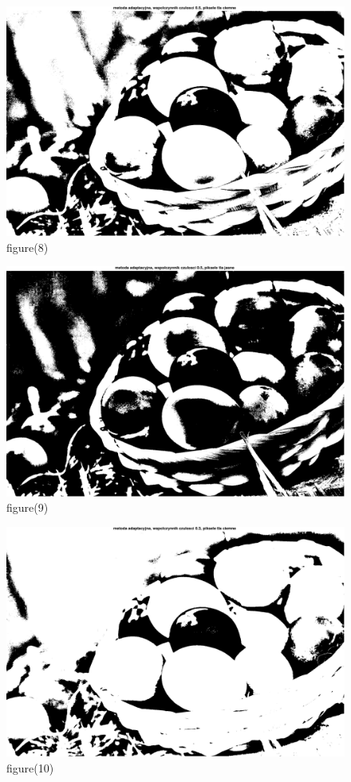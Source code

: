 \documentclass[10pt,a4paper,twoside]{article}%
\begin{document}
\begin{figure}[H]
    \centering
    \includegraphics[width=1\linewidth]{kod matlab/myVectorFile8.pdf}
\caption{figure(8)}
    \label{fig:obr1}
\end{figure}

\begin{figure}[H]
    \centering
    \includegraphics[width=1\linewidth]{kod matlab/myVectorFile9.pdf}
\caption{figure(9)}
    \label{fig:obr1}
\end{figure}

\begin{figure}[H]
    \centering
    \includegraphics[width=1\linewidth]{kod matlab/myVectorFile10.pdf}
\caption{figure(10)}
    \label{fig:obr1}
\end{figure}
\end{document}
